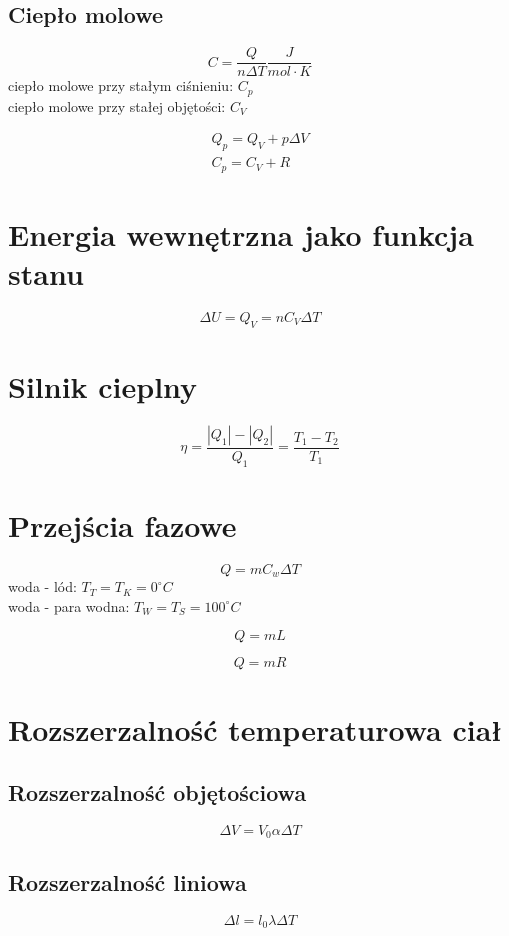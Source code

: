 \subsection{Ciepło molowe}
\begin{equation*}
  C = \frac{Q}{n \Delta T} \unit{\frac{J}{mol \cdot K}}
\end{equation*}
ciepło molowe przy stałym ciśnieniu: $C_p$\\
ciepło molowe przy stałej objętości: $C_V$

\begin{gather*}
  Q_p = Q_V + p \Delta V\\
  C_p = C_V + R
\end{gather*}

\section{Energia wewnętrzna jako funkcja stanu}
\begin{equation}
  \Delta U = Q_V = n C_V \Delta T
\end{equation}

\section{Silnik cieplny}
\begin{equation*}
  \eta = \frac{|Q_1|-|Q_2|}{Q_1} = \frac{T_1 - T_2}{T_1}
\end{equation*}

\section{Przejścia fazowe}
\begin{equation*}
  Q = m C_w \Delta T
\end{equation*}
woda - lód: $T_T = T_K = 0^\circ C$\\
woda - para wodna: $T_W = T_S = 100^\circ C$

\begin{equation*}
  Q = mL
\end{equation*}

\begin{equation*}
  Q = mR
\end{equation*}

\section{Rozszerzalność temperaturowa ciał}

\subsection{Rozszerzalność objętościowa}
\begin{equation*}
  \Delta V = V_0 \alpha \Delta T
\end{equation*}

\subsection{Rozszerzalność liniowa}
\begin{equation*}
  \Delta l = l_0 \lambda \Delta T
\end{equation*}
